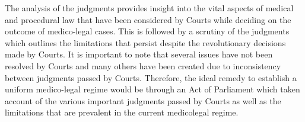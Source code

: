 \begin{multicols}{2}
\noi
The analysis of the judgments provides insight into the vital aspects of medical and procedural
law that have been considered by Courts while deciding on the outcome of medico-legal cases.
This is followed by a scrutiny of the judgments which outlines the limitations that persist despite
the revolutionary decisions made by Courts. It is important to note that several issues have not
been resolved by Courts and many others have been created due to inconsistency between
judgments passed by Courts. Therefore, the ideal remedy to establish a uniform medico-legal
regime would be through an Act of Parliament which taken account of the various important
judgments passed by Courts as well as the limitations that are prevalent in the current medicolegal regime.
\end{multicols}
\label{end2018-art7}


\newpage

\vskip 3cm


